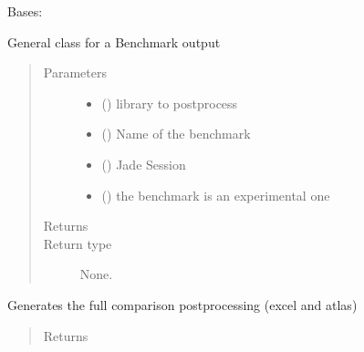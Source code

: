 \documentclass[letterpaper,10pt,english]{sphinxmanual}
\begin{document}
\begin{fulllineitems}
\label{\detokenize{api/postprocessing:output.BenchmarkOutput}}
\sphinxAtStartPar
Bases: {\hyperref[\detokenize{api/postprocessing:output.AbstractOutput}]{}}

\sphinxAtStartPar
General class for a Benchmark output
\begin{quote}\begin{description}
\item[{Parameters}] \leavevmode\begin{itemize}
\item {} 
\sphinxAtStartPar
{} () \textendash{} library to post\sphinxhyphen{}process

\item {} 
\sphinxAtStartPar
{} () \textendash{} Name of the benchmark

\item {} 
\sphinxAtStartPar
{} ({\hyperref[\detokenize{api/initobjects:main.Session}]{}}) \textendash{} Jade Session

\item {} 
\sphinxAtStartPar
{} () \textendash{} the benchmark is an experimental one

\end{itemize}

\item[{Returns}] \leavevmode
\sphinxAtStartPar


\item[{Return type}] \leavevmode
\sphinxAtStartPar
None.

\end{description}\end{quote}

\begin{fulllineitems}
\label{\detokenize{api/postprocessing:output.BenchmarkOutput.compare}}
\sphinxAtStartPar
Generates the full comparison post\sphinxhyphen{}processing (excel and atlas)
\begin{quote}\begin{description}
\item[{Returns}] \leavevmode
\sphinxAtStartPar



\end{description}
\end{quote}
\end{fulllineitems}
\end{fulllineitems}
\end{document}

